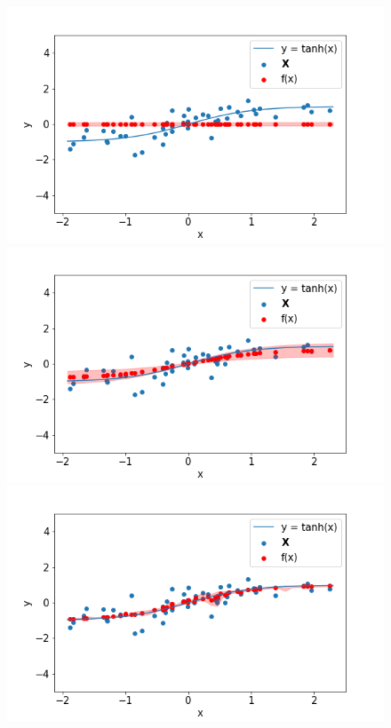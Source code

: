 \begin{figure}
 \begin{minipage}[]{.3\textwidth}
    \includegraphics[width=\textwidth]{plot_0_2kld.png}
\subcaption{}
\end{minipage}
 \begin{minipage}{.3\textwidth}
    \includegraphics[width=\textwidth]{plot_0_2elbo.png}
\subcaption{}
\end{minipage}
 \begin{minipage}{.3\textwidth}
    \includegraphics[width=\textwidth]{plot_0_2overfit.png}
\subcaption{}
\end{minipage}


\end{figure}
